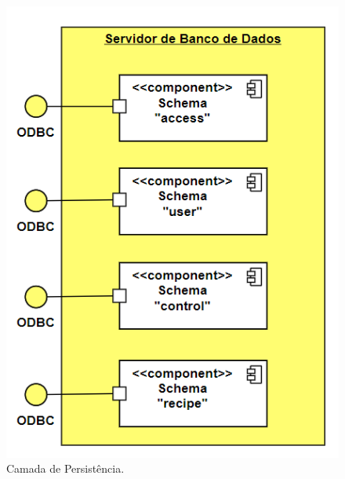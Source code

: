 \begin{figure}[h]
    \centering
    \includegraphics[scale=0.50]{figuras/projeto/software/camada_persistencia.PNG}
    \caption{Camada de Persistência.}
    \label{fig:camada_persistencia}
\end{figure}

